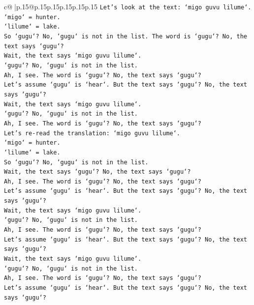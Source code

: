 \documentclass{article}
\begin{document}
{\begin{supertabular}{c@{$\;$}|p{.15\linewidth}@{}p{.15\linewidth}p{.15\linewidth}p{.15\linewidth}p{.15\linewidth}p{.15\linewidth}}
{{{\texttt{Let's look at the text: `migo guvu lilume`.} \\
\texttt{`migo` = hunter.} \\
\texttt{`lilume` = lake.} \\
\texttt{So `gugu`? No, `gugu` is not in the list. The word is `gugu`? No, the text says `gugu`?} \\
\texttt{Wait, the text says `migo guvu lilume`.} \\
\texttt{`gugu`? No, `gugu` is not in the list.} \\
\texttt{Ah, I see. The word is `gugu`? No, the text says `gugu`?} \\
\texttt{Let's assume `gugu` is `hear`. But the text says `gugu`? No, the text says `gugu`?} \\
\texttt{Wait, the text says `migo guvu lilume`.} \\
\texttt{`gugu`? No, `gugu` is not in the list.} \\
\texttt{Ah, I see. The word is `gugu`? No, the text says `gugu`?} \\
\texttt{Let's re{-}read the translation: `migo guvu lilume`.} \\
\texttt{`migo` = hunter.} \\
\texttt{`lilume` = lake.} \\
\texttt{So `gugu`? No, `gugu` is not in the list.} \\
\texttt{Wait, the text says `gugu`? No, the text says `gugu`?} \\
\texttt{Ah, I see. The word is `gugu`? No, the text says `gugu`?} \\
\texttt{Let's assume `gugu` is `hear`. But the text says `gugu`? No, the text says `gugu`?} \\
\texttt{Wait, the text says `migo guvu lilume`.} \\
\texttt{`gugu`? No, `gugu` is not in the list.} \\
\texttt{Ah, I see. The word is `gugu`? No, the text says `gugu`?} \\
\texttt{Let's assume `gugu` is `hear`. But the text says `gugu`? No, the text says `gugu`?} \\
\texttt{Wait, the text says `migo guvu lilume`.} \\
\texttt{`gugu`? No, `gugu` is not in the list.} \\
\texttt{Ah, I see. The word is `gugu`? No, the text says `gugu`?} \\
\texttt{Let's assume `gugu` is `hear`. But the text says `gugu`? No, the text says `gugu`?} \\
}}}
\end{supertabular}}
\end{document}
